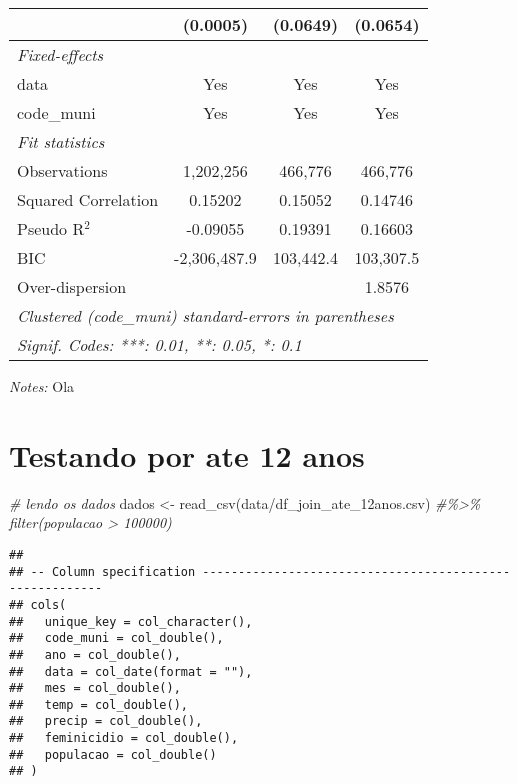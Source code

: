 \documentclass[
]{article}
\newenvironment{Shaded}{\begin{snugshade}}{\end{snugshade}}
\newcommand{\CommentTok}[1]{\textcolor[rgb]{0.56,0.35,0.01}{\textit{#1}}}
\newcommand{\FunctionTok}[1]{\textcolor[rgb]{0.00,0.00,0.00}{#1}}
\newcommand{\NormalTok}[1]{#1}
\newcommand{\OtherTok}[1]{\textcolor[rgb]{0.56,0.35,0.01}{#1}}
\newcommand{\StringTok}[1]{\textcolor[rgb]{0.31,0.60,0.02}{#1}}
\begin{document}
\begin{tabular}{lccc}
  &(0.0005) & (0.0649) & (0.0654)\\
\midrule \emph{Fixed-effects}&   &   &  \\
data & Yes & Yes & Yes\\
code\_muni & Yes & Yes & Yes\\
\midrule \emph{Fit statistics}&  & & \\
Observations & 1,202,256&466,776&466,776\\
Squared Correlation & 0.15202&0.15052&0.14746\\
Pseudo R$^2$ & -0.09055&0.19391&0.16603\\
BIC & -2,306,487.9&103,442.4&103,307.5\\
Over-dispersion & &&1.8576\\
\midrule\midrule\multicolumn{4}{l}{\emph{Clustered (code\_muni) standard-errors in parentheses}}\\
\multicolumn{4}{l}{\emph{Signif. Codes: ***: 0.01, **: 0.05, *: 0.1}}\\
\end{tabular}

\medskip \emph{Notes:} Ola

\hypertarget{testando-por-ate-12-anos}{%
\section{Testando por ate 12 anos}\label{testando-por-ate-12-anos}}

\begin{Shaded}
\begin{Highlighting}[]
\CommentTok{\# lendo os dados}
\NormalTok{dados }\OtherTok{\textless{}{-}} \FunctionTok{read\_csv}\NormalTok{(}\StringTok{\textquotesingle{}data/df\_join\_ate\_12anos.csv\textquotesingle{}}\NormalTok{) }\CommentTok{\#\%\textgreater{}\% filter(populacao \textgreater{} 100000)}
\end{Highlighting}
\end{Shaded}

\begin{verbatim}
## 
## -- Column specification --------------------------------------------------------
## cols(
##   unique_key = col_character(),
##   code_muni = col_double(),
##   ano = col_double(),
##   data = col_date(format = ""),
##   mes = col_double(),
##   temp = col_double(),
##   precip = col_double(),
##   feminicidio = col_double(),
##   populacao = col_double()
## )
\end{verbatim}
\end{document}
